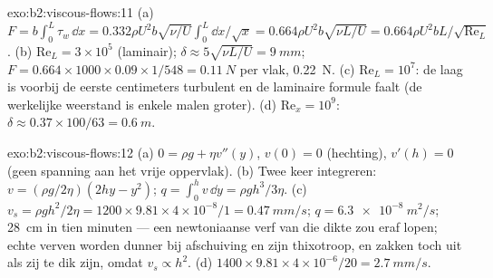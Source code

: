 \begin{solution}{exo:b2:viscous-flows:11}
(a)
$F = b\int_0^L\tau_w\,\dd x = 0.332\rho U^2b\sqrt{\nu/U}\int_0^L\dd x/\sqrt x =
0.664\rho U^2b\sqrt{\nu L/U} = 0.664\rho U^2bL/\sqrt{\mathrm{Re}_L}$.
(b) $\mathrm{Re}_L =
3 \times 10^5$ (laminair);
$\delta \approx 5\sqrt{\nu L/U} = \qty{9}{mm}$;
$F = 0.664 \times 1000
\times 0.09 \times 1/548 = \qty{0.11}{N}$ per vlak,
\qty{0.22}{N}. (c) $\mathrm{Re}_L = 10^7$: de laag is voorbij de eerste
centimeters turbulent en de laminaire formule faalt (de werkelijke weerstand
is enkele malen groter). (d) $\mathrm{Re}_x =
10^9$:
$\delta \approx 0.37 \times 100/63 = \qty{0.6}{m}$.
\end{solution}

\begin{solution}{exo:b2:viscous-flows:12}
(a) $0 = \rho g + \eta v''(y)$, $v(0) = 0$ (hechting), $v'(h) = 0$ (geen
spanning aan het vrije oppervlak). (b) Twee keer integreren:
$v = (\rho g/2\eta)(2hy - y^2)$; $q =
\int_0^hv\,\dd y = \rho gh^3/3\eta$.
(c)
$v_s = \rho gh^2/2\eta = 1200 \times 9.81 \times
4 \times 10^{-8}/1 = \qty{0.47}{mm/s}$;
$q = \qty{6.3e-8}{m^2/s}$; \qty{28}{cm} in tien minuten --- een newtoniaanse
verf van die dikte zou eraf lopen; echte verven worden dunner bij
afschuiving en zijn thixotroop, en zakken toch uit als zij te dik zijn,
omdat $v_s \propto h^2$. (d)
$1400 \times 9.81 \times 4 \times 10^{-6}/20 = \qty{2.7}{mm/s}$.
\end{solution}

